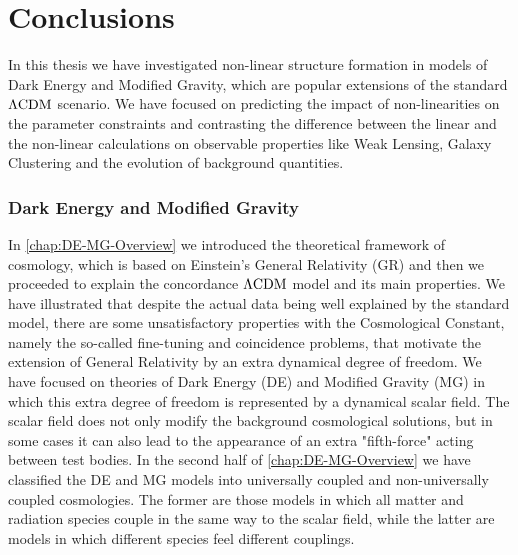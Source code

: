 \chapter*{Conclusions \label{Conclu}} %





\done{}
In this thesis we have investigated non-linear structure formation in models of Dark Energy and Modified 
Gravity, which are popular extensions of the standard $\Lambda\mathrm{CDM}$ scenario. We have focused on predicting the impact of non-linearities
on the parameter constraints and contrasting the difference between the linear and the non-linear calculations on observable properties like Weak Lensing, 
Galaxy Clustering and the evolution of background quantities.

\subsection*{Dark Energy and Modified Gravity}

In \cref{chap:DE-MG-Overview} we introduced the theoretical framework of cosmology, which is
based on Einstein's General Relativity (GR) and then we proceeded to explain the concordance $\Lambda\mathrm{CDM}$
model and its main properties. 
We have illustrated that despite the actual data being well explained by the standard model, 
there are some unsatisfactory properties with the Cosmological Constant, namely the so-called fine-tuning
and coincidence problems, that motivate the extension of General Relativity by an extra dynamical degree of freedom.
We have focused on theories of Dark Energy (DE) and Modified Gravity (MG) in which this extra degree of freedom  is represented by a dynamical scalar field. The scalar field does not 
only modify the background cosmological solutions,
but in some cases it can also lead to the appearance of an extra "fifth-force" acting between test bodies.
In the second half of \cref{chap:DE-MG-Overview} we have classified the DE and MG models into universally coupled  and non-universally coupled cosmologies. The former are those models in which all matter and radiation species couple
in the same way to the scalar field, while the latter are models in which different species feel different couplings. 

